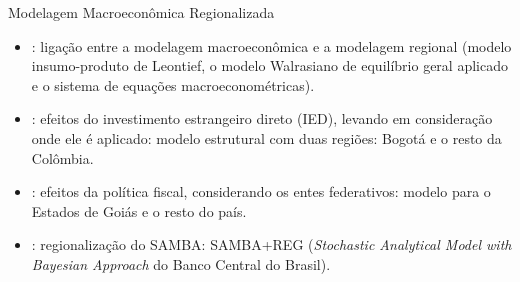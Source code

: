 \documentclass[presentation.tex]{subfiles}
\begin{document}

\begin{frame}[fragile]{Modelagem Macroeconômica Regionalizada}

\begin{itemize}

	\item \textcite{rickman_modern_2010}: ligação entre a modelagem macroeconômica e a modelagem regional (modelo insumo-produto de
	Leontief, o modelo Walrasiano de equilíbrio geral aplicado e o sistema de equações macroeconométricas).

	\item \textcite{mora_fdi_2019}: efeitos do investimento estrangeiro direto (IED), levando em consideração onde ele é aplicado: modelo estrutural com duas regiões: Bogotá e o resto da Colômbia.

	\item \textcite{costa_junior_dsge_2022}: efeitos da política fiscal, considerando os entes federativos: modelo para o Estados de Goiás e o resto do país.
	
\end{itemize}
		
\end{frame}


\begin{frame}
	
	\begin{itemize}
		
		\item \textcite{osterno_uma_2022}: regionalização do SAMBA: SAMBA+REG (\textit{Stochastic Analytical Model with Bayesian Approach} do Banco Central do Brasil).
				
	\end{itemize}
	
\end{frame}
\end{document}
